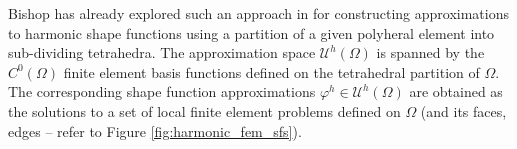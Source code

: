 %
	
	Bishop has already explored such an approach in \cite{Bishop:14} for constructing approximations to harmonic shape functions using a partition of a given polyheral element into sub-dividing tetrahedra. The approximation space $\mathcal{U}^h (\Omega)$ is spanned by the $C^0 (\Omega)$ finite element basis functions defined on the tetrahedral partition of $\Omega$. The corresponding shape function approximations $\varphi^h \in \mathcal{U}^h (\Omega)$ are obtained as the solutions to a set of local finite element problems defined on $\Omega$ (and its faces, edges -- refer to Figure \ref{fig:harmonic_fem_sfs}).
	
